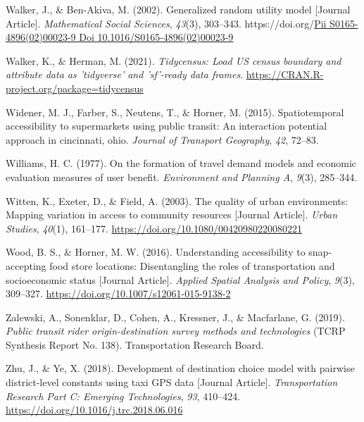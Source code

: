 \documentclass[review, 3p]{elsarticle} %
\newlength{\cslhangindent}
\newlength{\cslentryspacingunit} %
\newenvironment{CSLReferences}[2] %
 {%
  \setlength{\parindent}{0pt}
  \ifodd #1
  \let\oldpar\par
  \def\par{\hangindent=\cslhangindent\oldpar}
  \fi
  \setlength{\parskip}{#2\cslentryspacingunit}
 }%
 {}
\begin{document}
\begin{CSLReferences}{1}{0}
\leavevmode{}%
Walker, J., \& Ben-Akiva, M. (2002). Generalized random utility model {[}Journal Article{]}. \emph{Mathematical Social Sciences}, \emph{43}(3), 303--343. https://doi.org/\href{https://doi.org/Pii\%20S0165-4896(02)00023-9\%0ADoi\%2010.1016/S0165-4896(02)00023-9}{Pii S0165-4896(02)00023-9
Doi 10.1016/S0165-4896(02)00023-9}

\leavevmode{}%
Walker, K., \& Herman, M. (2021). \emph{Tidycensus: Load US census boundary and attribute data as 'tidyverse' and 'sf'-ready data frames}. \url{https://CRAN.R-project.org/package=tidycensus}

\leavevmode{}%
Widener, M. J., Farber, S., Neutens, T., \& Horner, M. (2015). Spatiotemporal accessibility to supermarkets using public transit: An interaction potential approach in cincinnati, ohio. \emph{Journal of Transport Geography}, \emph{42}, 72--83.

\leavevmode{}%
Williams, H. C. (1977). On the formation of travel demand models and economic evaluation measures of user benefit. \emph{Environment and Planning A}, \emph{9}(3), 285--344.

\leavevmode{}%
Witten, K., Exeter, D., \& Field, A. (2003). The quality of urban environments: Mapping variation in access to community resources {[}Journal Article{]}. \emph{Urban Studies}, \emph{40}(1), 161--177. \url{https://doi.org/10.1080/00420980220080221}

\leavevmode{}%
Wood, B. S., \& Horner, M. W. (2016). Understanding accessibility to snap-accepting food store locations: Disentangling the roles of transportation and socioeconomic status {[}Journal Article{]}. \emph{Applied Spatial Analysis and Policy}, \emph{9}(3), 309--327. \url{https://doi.org/10.1007/s12061-015-9138-2}

\leavevmode{}%
Zalewski, A., Sonenklar, D., Cohen, A., Kressner, J., \& Macfarlane, G. (2019). \emph{Public transit rider origin-destination survey methods and technologies} (TCRP Synthesis Report No. 138). Transportation Research Board.

\leavevmode{}%
Zhu, J., \& Ye, X. (2018). Development of destination choice model with pairwise district-level constants using taxi GPS data {[}Journal Article{]}. \emph{Transportation Research Part C: Emerging Technologies}, \emph{93}, 410--424. \url{https://doi.org/10.1016/j.trc.2018.06.016}

\end{CSLReferences}
\end{document}
